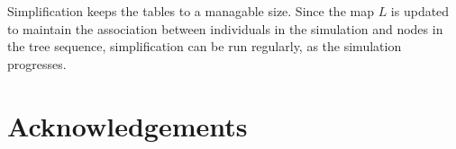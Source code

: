 \documentclass{article}
\begin{document}
Simplification keeps the tables to a managable size.
Since the map $L$ is updated to maintain the association between individuals in the simulation
and nodes in the tree sequence, simplification can be run regularly,
as the simulation progresses.

\section*{Acknowledgements}




\appendix
\end{document}
